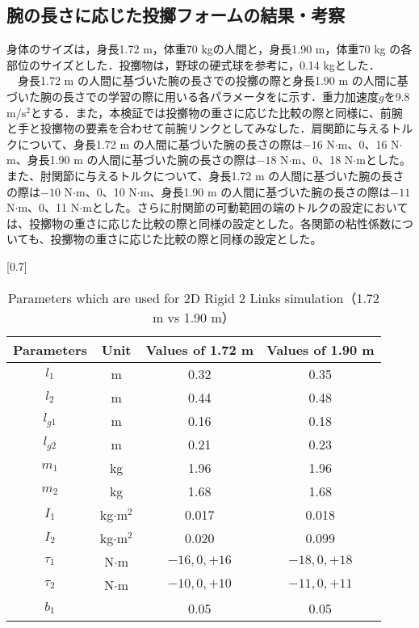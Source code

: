 \begin{small}
\subsection{腕の長さに応じた投擲フォームの結果・考察}
身体のサイズは，身長1.72 m，体重70 kgの人間と，身長1.90 m，体重70 kg の各部位のサイズとした．投擲物は，野球の硬式球を参考に，0.14 kgとした．\\
　身長1.72 m の人間に基づいた腕の長さでの投擲の際と身長1.90 m の人間に基づいた腕の長さでの学習の際に用いる各パラメータをに示す．重力加速度$g$を9.8 $\mathrm{m/s^{2}}$とする．また，本検証では投擲物の重さに応じた比較の際と同様に、前腕と手と投擲物の要素を合わせて前腕リンクとしてみなした．肩関節に与えるトルクについて、身長1.72 m の人間に基づいた腕の長さの際は$-16$ N$\cdot$m、0、16 N$\cdot$m、身長1.90 m の人間に基づいた腕の長さの際は$-18$ N$\cdot$m、0、18 N$\cdot$mとした。また、肘関節に与えるトルクについて、身長1.72 m の人間に基づいた腕の長さの際は$-10$ N$\cdot$m、0、10 N$\cdot$m、身長1.90 m の人間に基づいた腕の長さの際は$-11$ N$\cdot$m、0、11 N$\cdot$mとした。さらに肘関節の可動範囲の端のトルクの設定においては、投擲物の重さに応じた比較の際と同様の設定とした。各関節の粘性係数についても、投擲物の重さに応じた比較の際と同様の設定とした。
\begin{table}[tb]
  \begin{center}
    \caption{Parameters which are used for 2D Rigid 2 Links simulation（1.72 m vs 1.90 m）}
    \scalebox{0.7}[0.7]{
    \begin{tabular}{c|c|c|c}
      \hline
      Parameters & Unit & Values of 1.72 m & Values of 1.90 m \\
      \hline
      $l_{1}$ & m & 0.32 & 0.35 \\
      $l_{2}$ & m & 0.44 & 0.48 \\
      $l_{g1}$ & m & 0.16 & 0.18 \\
      $l_{g2}$ & m & 0.21 & 0.23 \\
      $m_{1}$ & kg & 1.96 & 1.96\\
      $m_{2}$ & kg & 1.68 & 1.68\\
      $I_{1}$ & kg$\cdot$$\mathrm{m}^2$ & 0.017 & 0.018 \\
      $I_{2}$ & kg$\cdot$$\mathrm{m}^2$ & 0.020 & 0.099 \\
      $\tau_{1}$ & N$\cdot$m & $-16, 0, +16$ & $-18, 0, +18$ \\
      $\tau_{2}$ & N$\cdot$m & $-10, 0, +10$ & $-11, 0, +11$ \\
      $b_{1}$ &  & 0.05 & 0.05\\

\end{tabular}}
\end{center}
\end{table}
\end{small}
